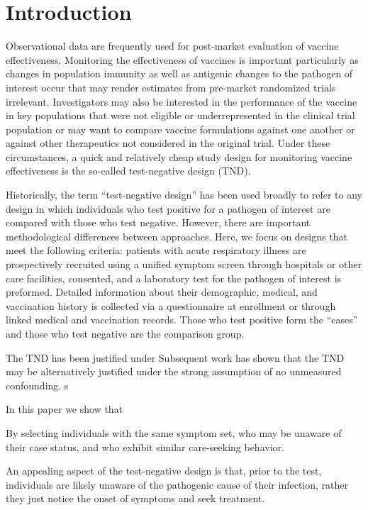 \documentclass[11pt]{article}
\begin{document}
\section{Introduction} \label{sec:introduction}
Observational data are frequently used for post-market evaluation of vaccine effectiveness. Monitoring the effectiveness of vaccines is important particularly as changes in population immunity as well as antigenic changes to the pathogen of interest occur that may render estimates from pre-market randomized trials irrelevant. Investigators may also be interested in the performance of the vaccine in key populations that were not eligible or underrepresented in the clinical trial population or may want to compare vaccine formulations against one another or against other therapeutics not considered in the original trial. Under these circumstances, a quick and relatively cheap study design for monitoring vaccine effectiveness is the so-called test-negative design (TND). 
 
Historically, the term ``test-negative design'' has been used  broadly to refer to any design in which individuals who test positive for a pathogen of interest are compared with those who test negative. However, there are important methodological differences between approaches. Here, we focus on designs that meet the following criteria: patients with acute respiratory illness are prospectively recruited using a unified symptom screen through hospitals or other care facilities, consented, and a laboratory test for the pathogen of interest is preformed. Detailed information about their demographic, medical, and vaccination history is collected via a questionnaire at enrollment or through linked medical and vaccination records. Those who test positive form the ``cases'' and those who test negative are the comparison group. 

The TND has been justified under Subsequent work has shown that the TND may be alternatively justified under the strong assumption of no unmeasured confounding. s

In this paper we show that 

By selecting individuals with the same symptom set, who may be unaware of their case status, and who exhibit similar care-seeking behavior. 

An appealing aspect of the test-negative design is that, prior to the test, individuals are likely unaware of the pathogenic cause of their infection, rather they just notice the onset of symptoms and seek treatment.
\end{document}
